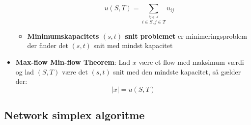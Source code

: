 \begin{itemize}
\begin{itemize}
    \begin{equation*}
      u(S,T) = \sum_{\stackrel{ij \in \mathcal A}{i \in S, j \in T}} u_{ij}
    \end{equation*}
    \item \textbf{Minimumskapacitets $(s,t)$ snit problemet} er minimeringsproblem der finder det $(s,t)$ snit med mindst kapacitet
  \end{itemize}
  \item \textbf{Max-flow Min-flow Theorem}: Lad $x$ være et flow med maksimum værdi og lad $(S,T)$ være det $(s,t)$ snit med den mindste kapacitet, så gælder der:
  \begin{equation*}
    |x| = u(S,T)
  \end{equation*}
\end{itemize}

\subsection{Network simplex algoritme}
